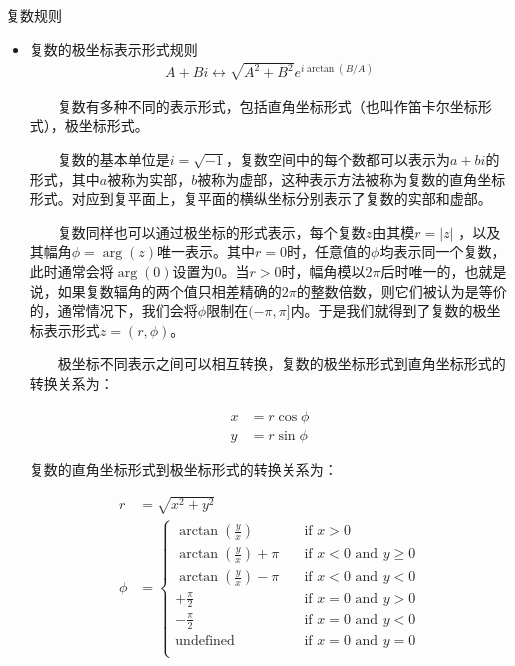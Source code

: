 \vspace{1mm}
\begin{center}
{\kaishu{} 复数规则}
\end{center}
\vspace{1mm}

\begin{itemize}

  \item {\kaishu 复数的极坐标表示形式规则} 
  \begin{gather*}
    A + Bi \longleftrightarrow \sqrt {A^2 + B^2} e^{i\arctan(B/A)}
  \end{gather*}
  
  　　复数有多种不同的表示形式，包括直角坐标形式（也叫作笛卡尔坐标形式），极坐标形式。

  　　复数的基本单位是$i=\sqrt{-1}$，复数空间中的每个数都可以表示为$a+bi$的形式，其中$a$被称为实部，$b$被称为虚部，这种表示方法被称为复数的直角坐标形式。对应到复平面上，复平面的横纵坐标分别表示了复数的实部和虚部。

  　　复数同样也可以通过极坐标的形式表示，每个复数$z$由其模$r = |z|$ ，以及其幅角$\phi=\arg(z)$唯一表示。其中$r=0$时，任意值的$\phi$均表示同一个复数，此时通常会将$\arg(0)$设置为$0$。当$r>0$时，幅角模以$2\pi$后时唯一的，也就是说，如果复数辐角的两个值只相差精确的$2\pi$的整数倍数，则它们被认为是等价的，通常情况下，我们会将$\phi$限制在$(-\pi, \pi]$内。于是我们就得到了复数的极坐标表示形式$z =(r, \phi)$。

  　　极坐标不同表示之间可以相互转换，复数的极坐标形式到直角坐标形式的转换关系为：

  \begin{equation*}
    \begin{split}
      x &= r \cos \phi \\
      y &= r \sin \phi
    \end{split}
  \end{equation*}

  复数的直角坐标形式到极坐标形式的转换关系为：

  \begin{equation*}
    \begin{split}
      r & = \sqrt{x^2+y^2} \\
      \phi & = 
      \begin{cases}
        \arctan(\frac{y}{x}) & \quad \text{if } x > 0 \\
        \arctan(\frac{y}{x}) + \pi & \quad \text{if } x < 0 \text{ and } y \geq 0 \\
        \arctan(\frac{y}{x}) - \pi & \quad \text{if } x < 0 \text{ and } y < 0 \\
        +\frac{\pi}{2} & \quad \text{if } x = 0 \text{ and } y > 0 \\
        -\frac{\pi}{2} & \quad \text{if } x = 0 \text{ and } y < 0 \\
        \text{undefined} & \quad \text{if } x = 0 \text{ and } y = 0 \\
      \end{cases}  
    \end{split}
  \end{equation*}


\end{itemize}
